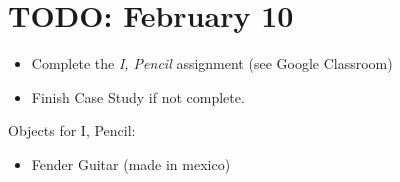 
\section{TODO: February 10}
\begin{itemize}
    \item Complete the \textit{I, Pencil} assignment (see Google Classroom)
    \item Finish Case Study if not complete.
\end{itemize}

Objects for I, Pencil:
\begin{itemize}
    \item Fender Guitar (made in mexico)
\end{itemize}

\pagebreak

